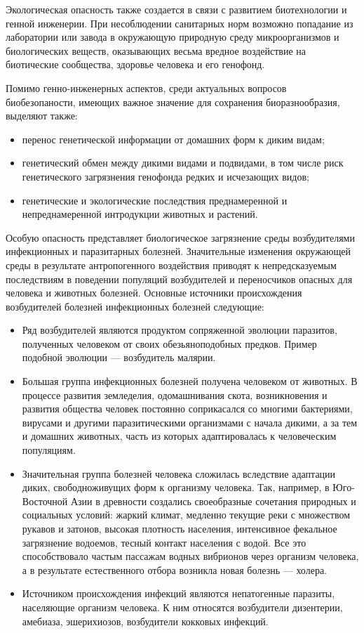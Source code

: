 \documentclass[a4paper, 12pt]{extarticle}
\begin{document}
Экологическая опасность также создается в связи с развитием биотехнологии и генной инженерии. При несоблюдении санитарных норм возможно попадание из лаборатории или завода в окружающую природную среду микроорганизмов и биологических веществ, оказывающих весьма вредное воздействие на биотические сообщества, здоровье человека и его генофонд.

Помимо генно-инженерных аспектов, среди актуальных вопросов биобезопаности, имеющих важное значение для сохранения биоразнообразия, выделяют также:
\begin{itemize}
    \item перенос генетической информации от домашних форм к диким видам;
    \item генетический обмен между дикими видами и подвидами, в том числе риск генетического загрязнения генофонда редких и исчезающих видов;
    \item генетические и экологические последствия преднамеренной и непреднамеренной интродукции животных и растений.
\end{itemize}

Особую опасность представляет биологическое загрязнение среды возбудителями инфекционных и паразитарных болезней. Значительные изменения окружающей среды в результате антропогенного воздействия приводят к непредсказуемым последствиям в поведении популяций возбудителей и переносчиков опасных для человека и животных болезней. Основные источники происхождения возбудителей болезней инфекционных болезней следующие:
\begin{itemize}
    \item Ряд возбудителей являются продуктом сопряженной эволюции паразитов, полученных человеком от своих обезьяноподобных предков. Пример подобной эволюции --- возбудитель малярии.
    \item Большая группа инфекционных болезней получена человеком от животных. В процессе развития земледелия, одомашнивания скота, возникновения и развития общества человек постоянно соприкасался со многими бактериями, вирусами и другими паразитическими организмами с начала дикими, а за тем и домашних животных, часть из которых адаптировалась к человеческим популяциям.
    \item Значительная группа болезней человека сложилась вследствие адаптации диких, свободноживущих форм к организму человека. Так, например, в Юго-Восточной Азии в древности создались своеобразные сочетания природных и социальных условий: жаркий климат, медленно текущие реки с множеством рукавов и затонов, высокая плотность населения, интенсивное фекальное загрязнение водоемов, тесный контакт населения с водой. Все это способствовало частым пассажам водных вибрионов через организм человека, а в результате естественного отбора возникла новая болезнь --- холера.
    \item Источником происхождения инфекций являются непатогенные паразиты, населяющие организм человека. К ним относятся возбудители дизентерии, амебиаза, эшерихиозов, возбудители кокковых инфекций.
\end{itemize}
\end{document}
